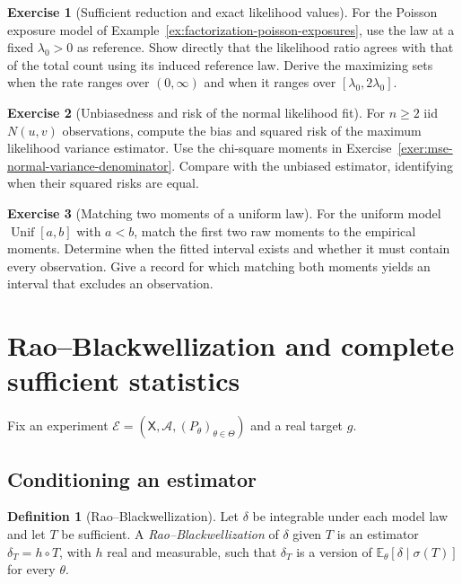 \documentclass[11pt,oneside]{book}
\theoremstyle{definition}
\newtheorem{definition}[theorem]{Definition}
\newtheorem{exercise}{Exercise}[section]
\theoremstyle{remark}
\begin{document}
\begin{exercise}[Sufficient reduction and exact likelihood values]
\label{exer:ml-poisson-exposure-reduction}
For the Poisson exposure model of
Example~\ref{ex:factorization-poisson-exposures}, use the law at
a fixed $\lambda_0>0$ as reference. Show directly that the
likelihood ratio agrees with that of the total count using
its induced reference law. Derive the maximizing sets when
the rate ranges over $(0,\infty)$ and when it ranges over
$[\lambda_0,2\lambda_0]$.
\end{exercise}

\begin{exercise}[Unbiasedness and risk of the normal likelihood fit]
\label{exer:ml-gaussian-variance-risk}
For $n\geq2$ iid $N(u,v)$ observations, compute the bias and
squared risk of the maximum likelihood variance estimator.
Use the chi-square moments in
Exercise~\ref{exer:mse-normal-variance-denominator}. Compare
with the unbiased estimator, identifying when their squared
risks are equal.
\end{exercise}

\begin{exercise}[Matching two moments of a uniform law]
\label{exer:mom-one-moment-discrepancy}
For the uniform model $\operatorname{Unif}[a,b]$ with $a<b$,
match the first two raw moments to the empirical moments.
Determine when the fitted interval exists and whether it
must contain every observation. Give a record for which
matching both moments yields an interval that excludes
an observation.
\end{exercise}



\clearpage
\section{Rao--Blackwellization and complete sufficient statistics}
\label{sec:rao-blackwell-lehmann-scheffe}

Fix an experiment $\mathcal E=(\mathsf X,\mathcal A,
(P_\theta)_{\theta\in\Theta})$ and a real target $g$.

\subsection{Conditioning an estimator}
\label{subsec:rao-blackwellization}

\begin{definition}[Rao--Blackwellization]
\label{def:rao-blackwellization}
Let $\delta$ be integrable under each model law and let $T$ be
sufficient. A \emph{Rao--Blackwellization} of $\delta$ given $T$ is
an estimator $\delta_T=h\circ T$, with $h$ real and measurable,
such that $\delta_T$ is a version of
$\mathbb E_\theta[\delta\mid\sigma(T)]$ for every $\theta$.
\end{definition}
\end{document}
